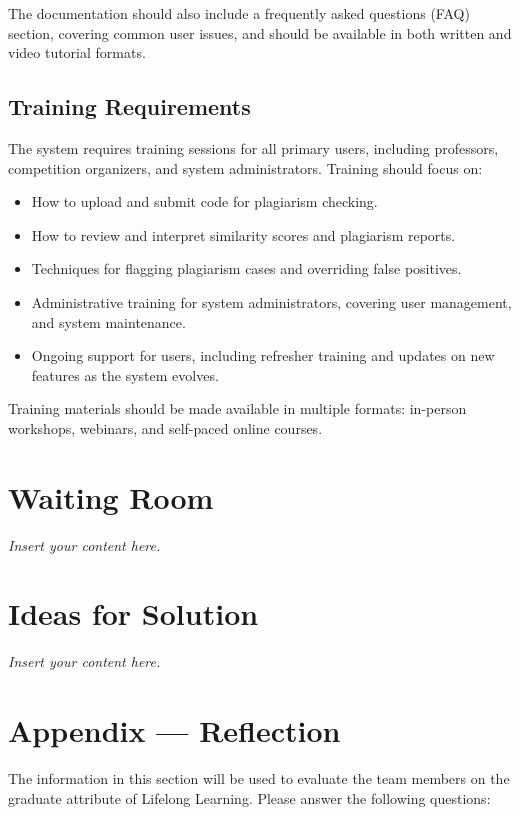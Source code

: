 \documentclass[12pt]{article}
\newcommand{\lips}{\textit{Insert your content here.}}
\begin{document}
The documentation should also include a frequently asked questions (FAQ) section, covering common user issues, and should be available in both written and video tutorial formats.

\subsection{Training Requirements}
The system requires training sessions for all primary users, including professors, competition organizers, and system administrators. Training should focus on:
\begin{itemize}
    \item How to upload and submit code for plagiarism checking.
    \item How to review and interpret similarity scores and plagiarism reports.
    \item Techniques for flagging plagiarism cases and overriding false positives.
    \item Administrative training for system administrators, covering user management, and system maintenance.
    \item Ongoing support for users, including refresher training and updates on new features as the system evolves.
\end{itemize}

Training materials should be made available in multiple formats: in-person workshops, webinars, and self-paced online courses.


\section{Waiting Room}
\lips

\section{Ideas for Solution}
\lips

\newpage{}
\section*{Appendix --- Reflection}

The information in this section will be used to evaluate the team members on the
graduate attribute of Lifelong Learning.  Please answer the following questions:
\end{document}
